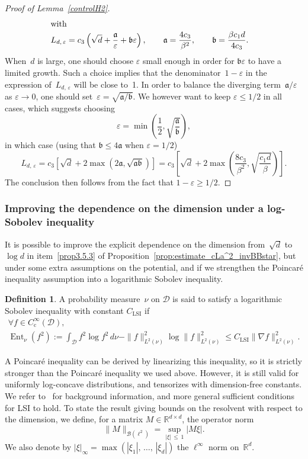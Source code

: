 \documentclass[10pt]{amsart}
\theoremstyle{definition}\newtheorem{defi}[theo]{Definition}\newtheorem{rema}[theo]{Remark}\newtheorem{exam}[theo]{Example}\newtheorem{exem}[theo]{Example}\newtheorem{nota}[theo]{Notation}
\newcommand{\rmc}{\mathrm{c}}
\newcommand{\LSI}{\mathrm{LSI}}
\DeclareMathOperator{\Ent}{Ent}
\newcommand{\cB}{\mathcal{B}}
\newcommand{\cD}{\mathcal{D}}
\newcommand{\R}{\mathbb{R}}
\newcommand{\frka}{\mathfrak{a}}
\newcommand{\frkb}{\mathfrak{b}}
\renewcommand{\leq}{\leqslant}
\renewcommand{\geq}{\geqslant}
\let\oldforall\forall
\renewcommand*{\forall}{\mathrel{\oldforall}}
\begin{document}
\begin{proof}[Proof of Lemma~\ref{controlH2}]
\begin{align*}
\intertext{with}
L_{d,\,\varepsilon} &= c_3\left(\sqrt{d}+\frac{\frka}{\varepsilon} + \frkb \varepsilon \right),
\qquad
\frka = \frac{4c_3}{\beta^2}, \qquad \frkb = \frac{\beta c_1 d}{4 c_3}.
\end{align*}
When~$d$ is large, one should choose $\varepsilon$ small enough in order for $\frkb\varepsilon$ to have a limited growth. Such a choice implies that the denominator~$1-\varepsilon$ in the expression of~$L_{d,\,\varepsilon}$ will be close to~1. In order to balance the diverging term~$\frka/\varepsilon$ as $\varepsilon \to 0$, one should set~$\varepsilon = \sqrt{\frka/\frkb}$. We however want to keep $\varepsilon \leq 1/2$ in all cases, which suggests choosing
\[
\varepsilon = \min\left(\frac12, \sqrt{\frac{\frka}{\frkb}}\right),
\]
in which case (using that $\frkb \leq 4\frka$ when $\varepsilon = 1/2$)
\[
L_{d,\,\varepsilon} = c_3\left[\sqrt{d}+2 \max\left(2\frka, \sqrt{\frka\frkb} \right)\right] = c_3\left[\sqrt{d}+2\max\left(\frac{8c_3}{\beta^2},\sqrt{\frac{c_1 d}{\beta}}\right) \right].
\]
The conclusion then follows from the fact that $1-\varepsilon \geq 1/2$.
\end{proof}


\subsubsection{Improving the dependence on the dimension under a log-Sobolev inequality}\label{sec:scaling_dimension_Langevin_improved}

It is possible to improve the explicit dependence on the dimension from~$\sqrt{d}$ to~$\log d$ in item~\eqref{prop3.5.3} of Proposition~\ref{prop:estimate_cLa^2_invBBstar}, but under some extra assumptions on the potential, and if we strengthen the Poincaré inequality assumption into a logarithmic Sobolev inequality.

\begin{defi}
A probability measure~$\nu$ on $\cD$ is said to satisfy a logarithmic Sobolev inequality with constant $C_{\LSI}$ if
\begin{multline*}
\forall f \in C_\rmc^\infty(\cD), \\ \Ent_{\nu}\left(f^2\right) := \int_{\cD} f^2\log f^2 \, d\nu - \|f\|_{L^2(\nu)}^2\log \|f\|_{L^2(\nu)}^2 \leq C_{\LSI}\|\nabla f\|_{L^2(\nu)}^2.
\end{multline*}
\end{defi}

A Poincaré inequality can be derived by linearizing this inequality, so it is strictly stronger than the Poincaré inequality we used above. However, it is still valid for uniformly log-concave distributions, and tensorizes with dimension-free constants. We refer to~\cite{Led99} for background information, and more general sufficient conditions for LSI to hold. To state the result giving bounds on the resolvent with respect to the dimension, we define, for a matrix $M \in \R^{d \times d}$, the operator norm
\[
\|M\|_{\cB\left(\ell^2\right)} = \sup_{|\xi|\,\leq\,1} |M\xi|.
\]
We also denote by $|\xi|_\infty = \max(|\xi_1|,\,\dots,\,|\xi_d|)$ the $\ell^\infty$ norm on~$\R^d$.
\end{document}
